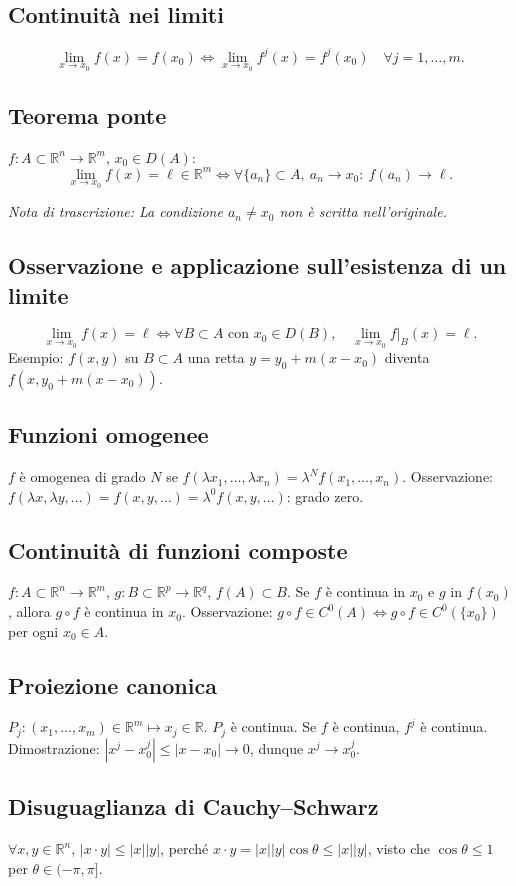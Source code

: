 \documentclass[11pt,a4paper]{article}
\newcommand{\R}{\mathbb R}\newcommand{\N}{\mathbb N}\newcommand{\pagina}[1]{\clearpage}
\newcommand{\nota}[1]{\par\textit{Nota di trascrizione: #1}\par}
\begin{document}
\subsection*{Continuità nei limiti}
\[\lim_{x\to x_0}f(x)=f(x_0)\iff\lim_{x\to x_0}f^j(x)=f^j(x_0)\quad\forall j=1,\ldots,m.\]
\subsection*{Teorema ponte}
$f:A\subset\R^n\to\R^m$, $x_0\in D(A)$:
\[\lim_{x\to x_0}f(x)=\ell\in\R^m\iff\forall\{a_n\}\subset A,\ a_n\to x_0:\ f(a_n)\to\ell.\]
\nota{La condizione $a_n\ne x_0$ non è scritta nell'originale.}
\subsection*{Osservazione e applicazione sull'esistenza di un limite}
\[\lim_{x\to x_0}f(x)=\ell\iff\forall B\subset A\text{ con }x_0\in D(B),\quad\lim_{x\to x_0}f|_B(x)=\ell.\]
Esempio: $f(x,y)$ su $B\subset A$ una retta $y=y_0+m(x-x_0)$ diventa $f(x,y_0+m(x-x_0))$.
\pagina{13}
\subsection*{Funzioni omogenee}
$f$ è omogenea di grado $N$ se $f(\lambda x_1,\ldots,\lambda x_n)=\lambda^N f(x_1,\ldots,x_n)$.
Osservazione: $f(\lambda x,\lambda y,\ldots)=f(x,y,\ldots)=\lambda^0f(x,y,\ldots)$: grado zero.
\subsection*{Continuità di funzioni composte}
$f:A\subset\R^n\to\R^m$, $g:B\subset\R^p\to\R^q$, $f(A)\subset B$.
Se $f$ è continua in $x_0$ e $g$ in $f(x_0)$, allora $g\circ f$ è continua in $x_0$.
Osservazione: $g\circ f\in C^0(A)\iff g\circ f\in C^0(\{x_0\})$ per ogni $x_0\in A$.
\subsection*{Proiezione canonica}
$P_j:(x_1,\ldots,x_m)\in\R^m\mapsto x_j\in\R$.
$P_j$ è continua. Se $f$ è continua, $f^j$ è continua.
Dimostrazione: $|x^j-x_0^j|\le|x-x_0|\to0$, dunque $x^j\to x_0^j$.
\pagina{14}
\subsection*{Disuguaglianza di Cauchy--Schwarz}
$\forall x,y\in\R^n$, $|x\cdot y|\le|x||y|$, perché $x\cdot y=|x||y|\cos\theta\le|x||y|$, visto che $\cos\theta\le1$ per $\theta\in(-\pi,\pi]$.
\end{document}
